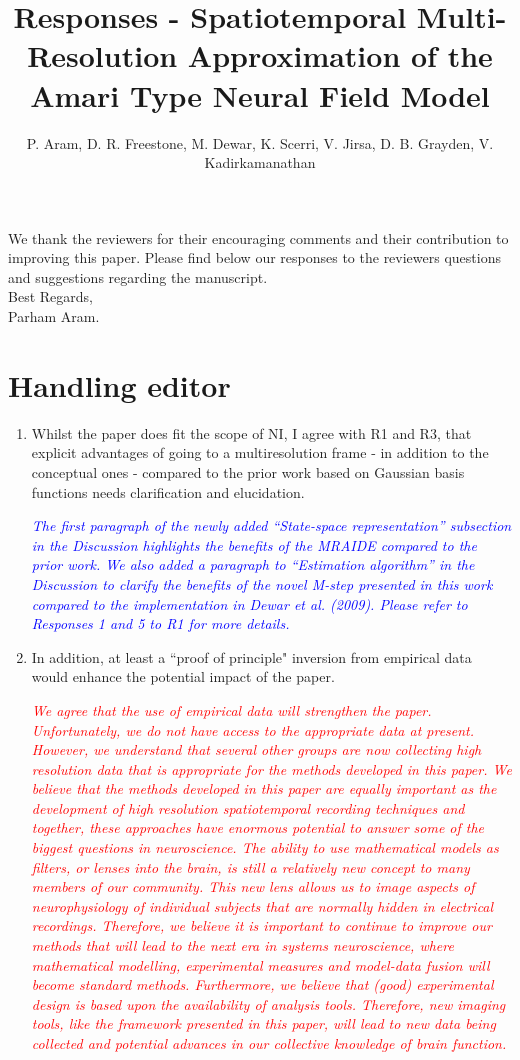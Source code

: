 \documentclass{article}
\title{Responses - Spatiotemporal Multi-Resolution Approximation of the Amari Type Neural Field Model}
\author{ P. Aram, D. R. Freestone, M. Dewar, K. Scerri, V. Jirsa, D. B. Grayden, V. Kadirkamanathan}
\newcommand{\dean}[1]{\textcolor{red}{#1}}
\newcommand{\parham}[1]{\textcolor{blue}{#1}}
\begin{document}
    \maketitle

    We thank the reviewers for their encouraging comments and their contribution to improving this paper. Please find below our responses to the reviewers questions and suggestions regarding the manuscript. 
\\

Best Regards,
\\

Parham Aram.

\section{Handling editor}
\begin{enumerate}
\item Whilst the paper does fit the scope of NI, I agree with R1 and R3, that explicit advantages of going to a multiresolution frame - in addition to the conceptual ones - compared to the prior work based on Gaussian basis functions needs clarification and elucidation.
 
\emph{\parham{The first paragraph of the newly added ``State-space representation'' subsection in the Discussion  highlights the benefits of the MRAIDE compared to the prior work. We also added a paragraph to ``Estimation algorithm'' in the Discussion to clarify the benefits of the novel M-step presented in this work compared to the implementation in Dewar et al. (2009). Please refer to Responses 1 and 5 to R1 for more details.}}

\item  In addition, at least a ``proof of principle" inversion from empirical data would enhance the potential impact of the paper. 

\dean{\emph{We agree that the use of empirical data will strengthen the paper. Unfortunately, we do not have access to the appropriate data at present. However, we understand that several other groups are now collecting high resolution data that is appropriate for the methods developed in this paper. We believe that the methods developed in this paper are equally important as the development of high  resolution spatiotemporal recording techniques and together, these approaches have enormous potential to answer some of the biggest questions in neuroscience. The ability to use mathematical models as filters, or lenses into the brain, is still a relatively new concept to many members of our community. This new lens allows us to image aspects of neurophysiology of individual subjects that are normally hidden in electrical recordings. Therefore, we believe it is important to continue to improve our methods that will lead to the next era in systems neuroscience, where mathematical modelling, experimental measures and model-data fusion will become standard methods. Furthermore, we believe that (good) experimental design is based upon the availability of analysis tools. Therefore, new imaging tools, like the framework presented in this paper, will lead to new data being collected and potential advances in our collective knowledge of brain function. } }
	

\end{enumerate}
\end{document}
